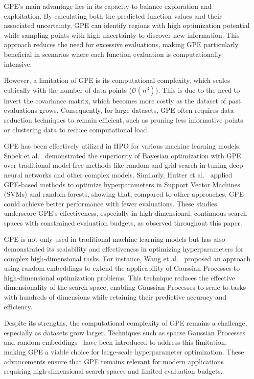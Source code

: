 GPE’s main advantage lies in its capacity to balance exploration and exploitation. By calculating both the predicted function values and their associated uncertainty, GPE can identify regions with high optimization potential while sampling points with high uncertainty to discover new information. This approach reduces the need for excessive evaluations, making GPE particularly beneficial in scenarios where each function evaluation is computationally intensive.

However, a limitation of GPE is its computational complexity, which scales cubically with the number of data points ($\mathcal{O}(n^3)$). This is due to the need to invert the covariance matrix, which becomes more costly as the dataset of past evaluations grows. Consequently, for large datasets, GPE often requires data reduction techniques to remain efficient, such as pruning less informative points or clustering data to reduce computational load.

GPE has been effectively utilized in HPO for various machine learning models. Snoek et al.~\cite{snoek2012practicalbayesianoptimizationmachine} demonstrated the superiority of Bayesian optimization with GPE over traditional model-free methods like random and grid search in tuning deep neural networks and other complex models. Similarly, Hutter et al.~\cite{10.1007/978-3-642-25566-3_40} applied GPE-based methods to optimize hyperparameters in Support Vector Machines (SVMs) and random forests, showing that, compared to other approaches, GPE could achieve better performance with fewer evaluations. These studies underscore GPE’s effectiveness, especially in high-dimensional, continuous search spaces with constrained evaluation budgets, as observed throughout this paper.

GPE is not only used in traditional machine learning models but has also demonstrated its scalability and effectiveness in optimizing hyperparameters for complex high-dimensional tasks. For instance, Wang et al.~\cite{wang2013bayesian} proposed an approach using random embeddings to extend the applicability of Gaussian Processes to high-dimensional optimization problems. This technique reduces the effective dimensionality of the search space, enabling Gaussian Processes to scale to tasks with hundreds of dimensions while retaining their predictive accuracy and efficiency.

Despite its strengths, the computational complexity of GPE remains a challenge, especially as datasets grow larger. Techniques such as sparse Gaussian Processes~\cite{titsias09a} and random embeddings~\cite{wang2013bayesian} have been introduced to address this limitation, making GPE a viable choice for large-scale hyperparameter optimization. These advancements ensure that GPE remains relevant for modern applications requiring high-dimensional search spaces and limited evaluation budgets.

